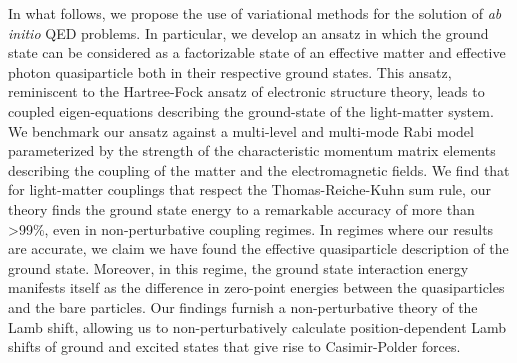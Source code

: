 \documentclass[aps,prl,twocolumn,
	groupedaddress,superscriptaddress,
	amsfonts,amssymb,amsmath,floatfix,
	citeautoscript]{revtex4-1}
\newcommand{\Jadd}[1]{\textcolor{blue}{#1}}
\begin{document}
In what follows, we propose the use of variational methods for the solution of \emph{ab initio} QED problems.  In particular, we develop an ansatz in which the ground state can be considered as a factorizable state of an effective matter and effective photon quasiparticle both in their respective ground states. This ansatz, reminiscent to the Hartree-Fock ansatz of electronic structure theory, leads to coupled eigen-equations describing the ground-state of the light-matter system. We benchmark our ansatz against a multi-level and multi-mode Rabi model parameterized by the strength of the characteristic momentum matrix elements describing the coupling of the matter and the electromagnetic fields. We find that for light-matter couplings that respect the Thomas-Reiche-Kuhn sum rule, our theory finds the ground state energy to a remarkable accuracy of more than >99\%, even in non-perturbative coupling regimes.  In regimes where our results are accurate, we claim we have found the effective quasiparticle description of the ground state. Moreover, in this regime, the ground state interaction energy manifests itself as the difference in zero-point energies between the quasiparticles and the bare particles.  Our findings furnish a non-perturbative theory of the Lamb shift, allowing us to non-perturbatively calculate position-dependent Lamb shifts of ground and excited states that give rise to Casimir-Polder forces.


\end{document}
